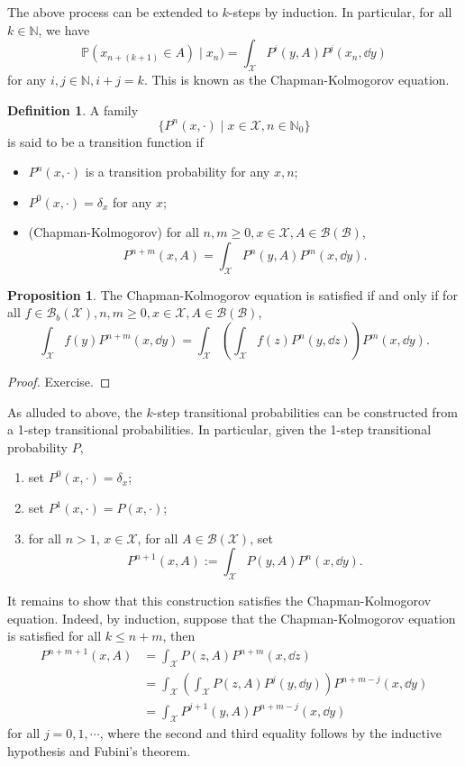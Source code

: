 \documentclass[]{article}
\theoremstyle{definition}
\theoremstyle{definition}
\newtheorem{definition}{Definition}[section]
\newtheorem{proposition}{Proposition}[section]
\begin{document}
The above process can be extended to \(k\)-steps by induction. In particular, 
for all \(k \in \mathbb{N}\), we have 
\[\mathbb{P}(x_{n + (k + 1)} \in A) \mid x_n) = 
  \int_{\mathcal{X}} P^i(y, A) P^j(x_n, \dd y)\]
for any \(i, j \in \mathbb{N}, i + j = k\). This is known as the Chapman-Kolmogorov 
equation.

\begin{definition}
  A family 
  \[\{P^n(x, \cdot) \mid x\in \mathcal{X}, n \in \mathbb{N}_0\}\]
  is said to be a transition function if 
  \begin{itemize}
    \item \(P^n(x, \cdot)\) is a transition probability for any \(x, n\);
    \item \(P^0(x, \cdot) = \delta_x\) for any \(x\);
    \item (Chapman-Kolmogorov) for all \(n, m \ge 0, x \in \mathcal{X}, A \in \mathcal{B}(\mathcal{B})\),
    \[P^{n + m}(x, A) = \int_{\mathcal{X}} P^n(y, A) P^m(x, \dd y).\]
  \end{itemize}
\end{definition}

\begin{proposition}
  The Chapman-Kolmogorov equation is satisfied if and only if for all 
  \(f \in \mathcal{B}_b(\mathcal{X}), n, m \ge 0, x \in \mathcal{X}, A \in \mathcal{B}(\mathcal{B})\), 
  \[\int_{\mathcal{X}}f(y)P^{n + m}(x, \dd y) = 
  \int_{\mathcal{X}}\left(\int_{\mathcal{X}} f(z) P^n(y, \dd z)\right) P^m(x, \dd y).\]
\end{proposition}
\begin{proof}
  Exercise.
\end{proof}

As alluded to above, the \(k\)-step transitional probabilities can be constructed from a 
1-step transitional probabilities. In particular, given the 1-step transitional 
probability \(P\),
\begin{enumerate}
  \item set \(P^0(x, \cdot) = \delta_x\);
  \item set \(P^1(x, \cdot) = P(x, \cdot)\);
  \item for all \(n > 1\), \(x \in \mathcal{X}\), for all \(A \in \mathcal{B}(\mathcal{X})\), set 
    \[P^{n + 1}(x, A) := \int_{\mathcal{X}} P(y, A) P^n(x, \dd y).\]
\end{enumerate}
It remains to show that this construction satisfies the Chapman-Kolmogorov equation.
Indeed, by induction, suppose that the Chapman-Kolmogorov equation is satisfied for 
all \(k \le n + m\), then 
\[\begin{split}
  P^{n + m + 1}(x, A) & = \int_{\mathcal{X}}P(z, A)P^{n + m}(x, \dd z) \\
  & = \int_{\mathcal{X}}\left(\int_{\mathcal{X}} P(z, A) P^j(y, \dd y)\right) P^{n + m - j}(x, \dd y)\\
  & = \int_{\mathcal{X}}P^{j + 1}(y, A)P^{n + m - j}(x, \dd y)
\end{split}\]
for all \(j = 0, 1, \cdots\), where the second and third equality follows by the 
inductive hypothesis and Fubini's theorem.
\end{document}
